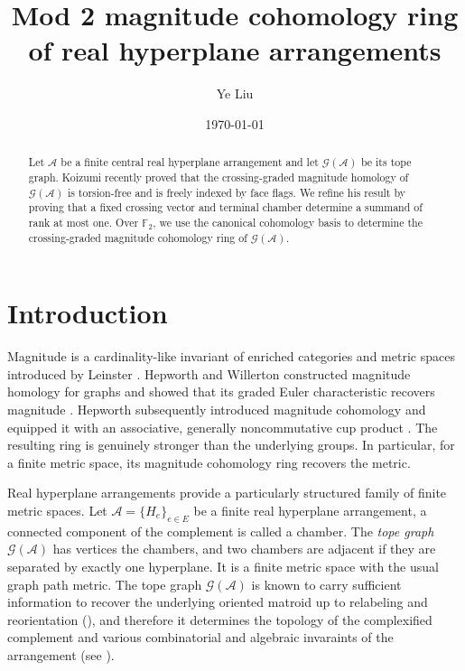 \documentclass[10pt]{amsart}
\theoremstyle{plain}
\theoremstyle{definition}
\newcommand{\A}{\mathcal{A}}
\newcommand{\G}{\mathcal{G}}
\begin{document}
\title{Mod 2 magnitude cohomology ring of real hyperplane arrangements}
\author[Y. Liu]{Ye Liu}
\address{Department of Pure Mathematics, Xi’an Jiaotong-Liverpool University, Suzhou, Jiangsu 215123, P. R. China}

\date{\today}

\begin{abstract}
Let $\mathcal{A}$ be a finite central real hyperplane arrangement and let $\mathcal{G}(\mathcal{A})$ be its tope graph. Koizumi recently proved that the crossing-graded magnitude homology of $\mathcal{G}(\mathcal{A})$ is torsion-free and is freely indexed by face flags. We refine his result by proving that a fixed crossing vector and terminal chamber determine a summand of rank at most one. Over $\mathbb{F}_2$, we use the canonical cohomology basis to determine the crossing-graded magnitude cohomology ring of $\mathcal{G}(\mathcal{A})$.
\end{abstract}

\maketitle
\setcounter{tocdepth}{1}
\tableofcontents



\section{Introduction}

Magnitude is a cardinality-like invariant of enriched categories and metric spaces introduced by Leinster \cite{Leinster2013,Leinster2019}. Hepworth and Willerton constructed magnitude homology for graphs and showed that its graded Euler characteristic recovers magnitude \cite{Hepworth2017}. Hepworth subsequently introduced magnitude cohomology and equipped it with an associative, generally noncommutative cup product \cite{Hepworth2022}. The resulting ring is genuinely stronger than the underlying groups. In particular, for a finite metric space, its magnitude cohomology ring recovers the metric.

Real hyperplane arrangements provide a particularly structured family of finite metric spaces. Let $\A=\{H_e\}_{e\in E}$ be a finite real hyperplane arrangement, a connected component of the complement is called a chamber. The \emph{tope graph} $\G(\A)$ has vertices the chambers, and two chambers are adjacent if they are separated by exactly one hyperplane. It is a finite metric space with the usual graph path metric. The tope graph $\G(\A)$ is known to carry sufficient information to recover the underlying oriented matroid up to relabeling and reorientation (\cite[Theorem 4.2.14]{Bjorner1999}), and therefore it determines the topology of the complexified complement and various combinatorial and algebraic invaraints of the arrangement (see \cite{Yagi2026}).
\end{document}
